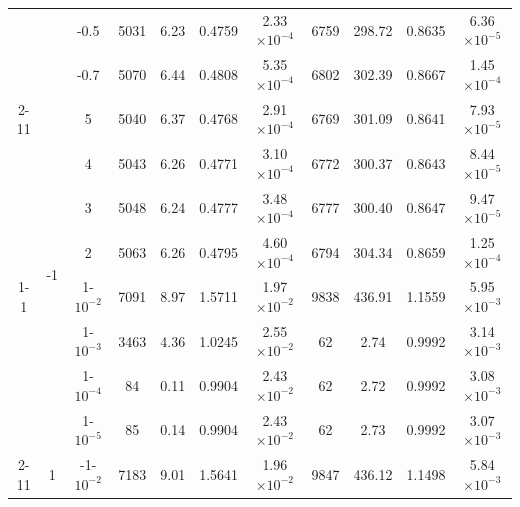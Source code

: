 \documentclass[pdflatex,sn-mathphys-num]{sn-jnl}%
\theoremstyle{thmstyleone}%
\theoremstyle{thmstyletwo}%
\theoremstyle{thmstylethree}%
\begin{document}
\begin{table}[]
{\begin{tabular}{ccccccccccc}
			\multicolumn{1}{c|}{} & \multicolumn{1}{c|}{} & \multicolumn{1}{c|}{-0.5} & 5031 & 6.23 & 0.4759  & \multicolumn{1}{c|}{2.33$\times 10^{-4}$} & 6759 & 298.72 & 0.8635 & 6.36$\times 10^{-5}$\\
			\multicolumn{1}{c|}{} & \multicolumn{1}{c|}{} & \multicolumn{1}{c|}{-0.7} & 5070 & 6.44 & 0.4808 & \multicolumn{1}{c|}{5.35$\times 10^{-4}$} & 6802 & 302.39 & 0.8667 & 1.45$\times 10^{-4}$\\ \cmidrule{2-11}
			\multicolumn{1}{c|}{\multirow{20}{*}{$<0$}} & \multicolumn{1}{c|}{\multirow{8}{*}{-1}} & \multicolumn{1}{c|}{5}& 5040 & 6.37 & 0.4768 & \multicolumn{1}{c|}{2.91$\times 10^{-4}$} & 6769 & 301.09 & 0.8641 & 7.93$\times 10^{-5}$\\
			\multicolumn{1}{c|}{} & \multicolumn{1}{c|}{} & \multicolumn{1}{c|}{4} & 5043 & 6.26 & 0.4771 & \multicolumn{1}{c|}{3.10$\times 10^{-4}$} & 6772 & 300.37 & 0.8643 & 8.44$\times 10^{-5}$\\
			\multicolumn{1}{c|}{} & \multicolumn{1}{c|}{} & \multicolumn{1}{c|}{3} & 5048 & 6.24 & 0.4777 & \multicolumn{1}{c|}{3.48$\times 10^{-4}$} & 6777 & 300.40 & 0.8647 & 9.47$\times 10^{-5}$\\
			\multicolumn{1}{c|}{} & \multicolumn{1}{c|}{} & \multicolumn{1}{c|}{2} & 5063 & 6.26 & 0.4795 & \multicolumn{1}{c|}{4.60$\times 10^{-4}$} & 6794 & 304.34 & 0.8659 & 1.25$\times 10^{-4}$\\ \cmidrule{1-1}\cmidrule{3-11}
			\multicolumn{1}{c|}{} & \multicolumn{1}{c|}{} & \multicolumn{1}{c|}{1-$10^{-2}$} & 7091 & 8.97 & 1.5711 & \multicolumn{1}{c|}{1.97$\times 10^{-2}$} & 9838 & 436.91 & 1.1559 & 5.95$\times 10^{-3}$\\
			\multicolumn{1}{c|}{} & \multicolumn{1}{c|}{} & \multicolumn{1}{c|}{1-$10^{-3}$}& 3463 & 4.36 & 1.0245 & \multicolumn{1}{c|}{2.55$\times 10^{-2}$}& 62 & 2.74 & 0.9992 & 3.14$\times 10^{-3}$\\
			\multicolumn{1}{c|}{} & \multicolumn{1}{c|}{} & \multicolumn{1}{c|}{1-$10^{-4}$}& 84 & 0.11 & 0.9904 & \multicolumn{1}{c|}{2.43$\times 10^{-2}$} & 62 & 2.72 & 0.9992 & 3.08$\times 10^{-3}$\\
			\multicolumn{1}{c|}{} & \multicolumn{1}{c|}{} & \multicolumn{1}{c|}{1-$10^{-5}$}& 85 & 0.14 & 0.9904  & \multicolumn{1}{c|}{2.43$\times 10^{-2}$}& 62 & 2.73 & 0.9992 & 3.07$\times 10^{-3}$\\ \cmidrule{2-11}
			\multicolumn{1}{c|}{} & \multicolumn{1}{c|}{\multirow{4}{*}{1}} & \multicolumn{1}{c|}{-1-$10^{-2}$} & 7183 & 9.01 & 1.5641 & \multicolumn{1}{c|}{1.96$\times 10^{-2}$} & 9847 & 436.12 & 1.1498 & 5.84$\times 10^{-3}$\\

\end{tabular}}
\end{table}
\end{document}
